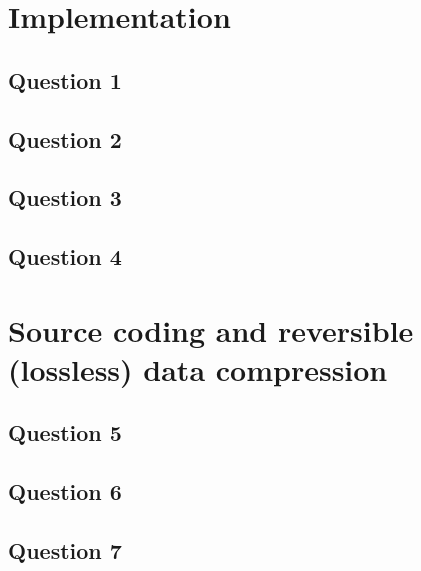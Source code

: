 \documentclass[]{template}
\newcommand{\tablemat}{~}
\renewcommand{\tablemat}{\tableofcontents}
\begin{document}
\begin{guardpage}
    \begin{authors}{0.18}
    \end{authors}

\end{guardpage}

\newpage
\tablemat
\newpage

\section{Implementation}

    \subsection{Question 1}

    \subsection{Question 2}

    \subsection{Question 3}

    \subsection{Question 4}

\section{Source coding and reversible (lossless) data compression}

    \subsection{Question 5}

    \subsection{Question 6}

    \subsection{Question 7}
\end{document}
